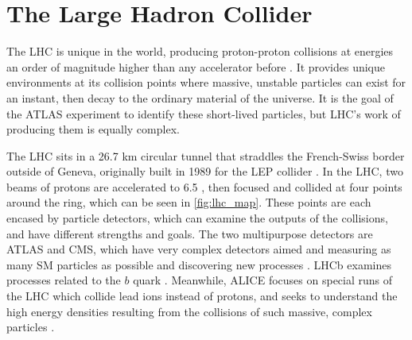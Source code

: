 
\chapter{The Large Hadron Collider} %

\label{ch:lhc} %


The \ac{LHC} is unique in the world, producing proton-proton collisions at energies an order of magnitude higher than any accelerator before \cite{1748-0221-3-08-S08001}. It provides unique environments at its collision points where massive, unstable particles can exist for an instant, then decay to the ordinary material of the universe. It is the goal of the ATLAS experiment to identify these short-lived particles, but \ac{LHC}'s work of producing them is equally complex. 

The \ac{LHC} sits in a 26.7 km circular tunnel that straddles the French-Swiss border outside of Geneva, originally built in 1989 for the \ac{LEP} collider \cite{lep_tdr}. In the \ac{LHC}, two beams of protons are accelerated to 6.5 \tev, then focused and collided at four points around the ring, which can be seen in \autoref{fig:lhc_map}. These points are each encased by particle detectors, which can examine the outputs of the collisions, and have different strengths and goals. The two multipurpose detectors are ATLAS and \ac{CMS}, which have very complex detectors aimed and measuring as many \ac{SM} particles as possible and discovering new processes \cite{PERF-2007-01, 1748-0221-3-08-S08004}. \ac{LHCb} examines processes related to the $b$ quark \cite{1748-0221-3-08-S08005}. Meanwhile, \ac{ALICE} focuses on special runs of the \ac{LHC} which collide lead ions instead of protons, and seeks to understand the high energy densities resulting from the collisions of such massive, complex particles \cite{1748-0221-3-08-S08002}. 

